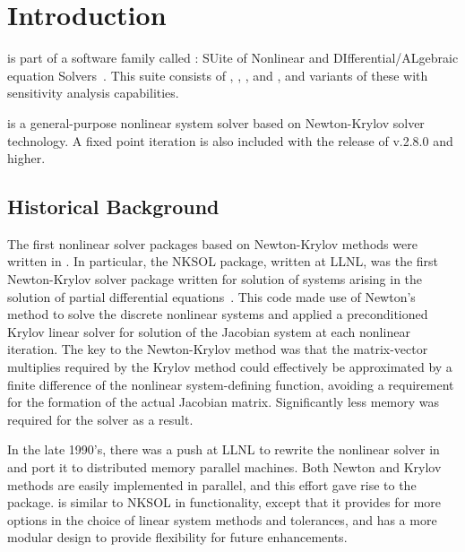 \chapter{Introduction}\label{s:intro}

{\kinsol} is part of a software family called {\sundials}: SUite
of Nonlinear and DIfferential/ALgebraic equation Solvers~\cite{HBGLSSW:05}.
This suite consists of {\cvode}, {\arkode}, {\kinsol}, and {\ida}, and variants
of these with sensitivity analysis capabilities.

%
{\kinsol} is a
general-purpose nonlinear system solver based on Newton-Krylov
solver technology.  A fixed point iteration is also included with the release
of {\kinsol} v.2.8.0 and higher.

\section{Historical Background}\label{ss:history}

  The first
nonlinear solver packages based on Newton-Krylov methods were
written in {\F}.  In particular, the NKSOL package, written at
LLNL, was the first Newton-Krylov solver package written for
solution of systems arising in the solution of partial differential
equations~\cite{BrSa:90}.  This {\F} code made use of Newton's
method to solve the discrete nonlinear systems and applied a
preconditioned Krylov linear solver for solution of the Jacobian
system at each nonlinear iteration.  The key to the Newton-Krylov
method was that the matrix-vector multiplies required by the
Krylov method could effectively be approximated by a finite
difference of the nonlinear system-defining function, avoiding a
requirement for the formation of the actual Jacobian matrix.
Significantly less memory was required for the solver as a result.

In the late 1990's, there was a push at LLNL to rewrite the
nonlinear solver in {\CC} and port it to distributed memory
parallel machines.  Both Newton and Krylov methods are easily
implemented in parallel, and this effort gave rise to the
{\kinsol} package. {\kinsol} is similar to NKSOL in functionality,
except that it provides for more options in the choice of linear
system methods and tolerances, and has a more modular design to provide
flexibility for future enhancements.

